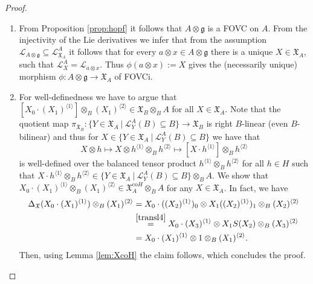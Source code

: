 \documentclass{article}
\theoremstyle{definition}
\begin{document}
\begin{proof}
	\begin{enumerate}
		\item[i.)] From Proposition \ref{prop:hopf} it follows that $A\otimes\mathfrak{g}$ is a FOVC on $A$. From the injectivity of the Lie derivatives we infer that from the assumption $\mathscr{L}_{A\otimes\mathfrak{g}}\subseteq\mathscr{L}^A_{\mathfrak{X}_A}$ it follows that for every $a\otimes x\in A\otimes\mathfrak{g}$ there is a unique $X\in\mathfrak{X}_A$, such that $\mathscr{L}^A_X=\mathscr{L}_{a\otimes x}$. Thus $\phi(a\otimes x):=X$ gives the (necessarily unique) morphism $\phi\colon A\otimes\mathfrak{g}\to\mathfrak{X}_A$ of FOVCi.
		
		\item[ii.)] For well-definedness we have to argue that $[X_0\cdot(X_1)^{\langle 1\rangle}]\otimes_B(X_1)^{\langle 2\rangle}\in\mathfrak{X}_B\otimes_BA$ for all $X\in\mathfrak{X}_A$. Note that the quotient map $\pi_{\mathfrak{X}_B}\colon\{Y\in\mathfrak{X}_A~|~\mathscr{L}^A_Y(B)\subseteq B\}\to\mathfrak{X}_B$ is right $B$-linear (even $B$-bilinear) and thus for $X\in\{Y\in\mathfrak{X}_A~|~\mathscr{L}^A_Y(B)\subseteq B\}$ we have that
		$$
		X\otimes h\mapsto X\otimes h^{\langle 1\rangle}\otimes_Bh^{\langle 2\rangle}
		\mapsto[X\cdot h^{\langle 1\rangle}]\otimes_Bh^{\langle 2\rangle}
		$$
		is well-defined over the balanced tensor product $h^{\langle 1\rangle}\otimes_Bh^{\langle 2\rangle}$ for all $h\in H$ such that $X\cdot h^{\langle 1\rangle}\otimes_Bh^{\langle 2\rangle}\in\{Y\in\mathfrak{X}_A~|~\mathscr{L}^A_Y(B)\subseteq B\}\otimes_BA$.
		We show that $X_0\cdot(X_1)^{\langle 1\rangle}\otimes_B(X_1)^{\langle 2\rangle}\in\mathfrak{X}_A^{\mathrm{co}H}\otimes_BA$ for any $X\in\mathfrak{X}_A$. In fact, we have
		\begin{align*}
			\Delta_{\mathfrak{X}}(X_0\cdot(X_1)^{\langle 1\rangle})\otimes_B(X_1)^{\langle 2\rangle}
			&=X_0\cdot((X_2)^{\langle 1\rangle})_0\otimes X_1((X_2)^{\langle 1\rangle})_1\otimes_B(X_2)^{\langle 2\rangle}\\
			&\overset{\ref{transl4}}{=}X_0\cdot(X_3)^{\langle 1\rangle}\otimes X_1S(X_2)\otimes_B(X_3)^{\langle 2\rangle}\\
			&=X_0\cdot(X_1)^{\langle 1\rangle}\otimes 1\otimes_B(X_1)^{\langle 2\rangle}.
		\end{align*}
		Then, using Lemma \ref{lem:XcoH} the claim follows, which concludes the proof.
	\end{enumerate}
\end{proof}
\end{document}

